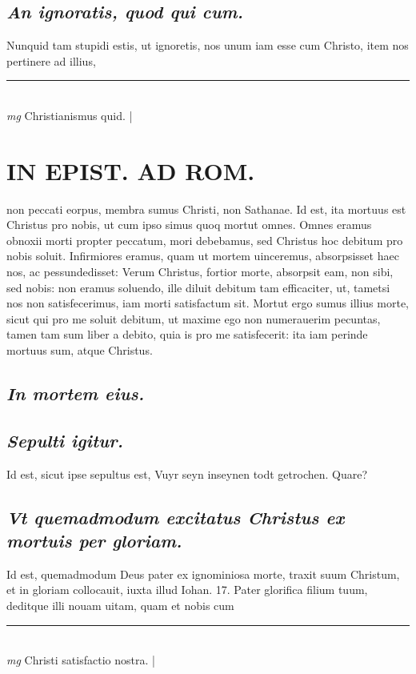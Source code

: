 \documentclass{article}
\begin{document}
\begin{pages}
\subsection*{\textit{An ignoratis, quod qui cum. }}\pstart Nunquid tam stupidi estis, ut ignoretis, nos unum iam esse cum Christo, item nos pertinere ad illius,  \pend
\vspace{0.5cm}\noindent
\vspace{0.2cm}\rule{1cm}{0.2pt}\\ 
\hspace{0.2cm}\textit{mg}
\footnotesize Christianismus quid. 
\normalsize| 
\section*{IN EPIST. AD ROM.  }
\marginpar{[ p.59 ]}\pstart non peccati eorpus, membra sumus Christi, non Sathanae.   \pend\pstart Id est, ita mortuus est Christus pro nobis, ut cum ipso simus quoq mortut omnes. Omnes eramus obnoxii morti propter peccatum, mori debebamus, sed Christus hoc debitum pro nobis soluit. Infirmiores eramus, quam ut mortem uinceremus, absorpsisset haec nos, ac pessundedisset: Verum Christus, fortior morte, absorpsit eam, non sibi, sed nobis: non eramus soluendo, ille diluit debitum tam efficaciter, ut, tametsi nos non satisfecerimus, iam morti satisfactum sit. Mortut ergo sumus illius morte, sicut qui pro me soluit debitum, ut maxime ego non numerauerim pecuntas, tamen tam sum liber a debito, quia is pro me satisfecerit: ita iam perinde mortuus sum, atque Christus.   \pend
{}
{}
\subsection*{\textit{In mortem eius. }}
{}
\subsection*{\textit{Sepulti igitur. }}\pstart Id est, sicut ipse sepultus est, Vuyr seyn inseynen todt getrochen. Quare?  \pend
{}
{}
\subsection*{\textit{Vt quemadmodum excitatus Christus ex mortuis per gloriam. }}\pstart Id est, quemadmodum Deus pater ex ignominiosa morte, traxit suum Christum, et in gloriam collocauit, iuxta illud Iohan. 17. Pater glorifica filium tuum, deditque illi nouam uitam, quam et nobis cum  \pend
\vspace{0.5cm}\noindent
\vspace{0.2cm}\rule{1cm}{0.2pt}\\ 
\hspace{0.2cm}\textit{mg}
\footnotesize Christi satisfactio nostra.  
\normalsize| 

\end{pages}
\end{document}
